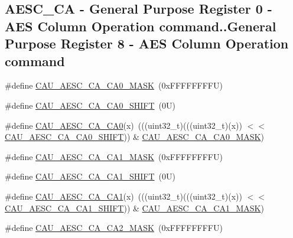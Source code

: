 \subsection*{A\+E\+S\+C\+\_\+\+CA -\/ General Purpose Register 0 -\/ A\+ES Column Operation command..General Purpose Register 8 -\/ A\+ES Column Operation command}
\begin{DoxyCompactItemize}
\item 
\#define \mbox{\hyperlink{group___c_a_u___register___masks_ga285f901e854cf3e043f122d717e5403d}{C\+A\+U\+\_\+\+A\+E\+S\+C\+\_\+\+C\+A\+\_\+\+C\+A0\+\_\+\+M\+A\+SK}}~(0x\+F\+F\+F\+F\+F\+F\+F\+F\+U)
\item 
\#define \mbox{\hyperlink{group___c_a_u___register___masks_gab92e18684282103f4374d6915f54d702}{C\+A\+U\+\_\+\+A\+E\+S\+C\+\_\+\+C\+A\+\_\+\+C\+A0\+\_\+\+S\+H\+I\+FT}}~(0\+U)
\item 
\#define \mbox{\hyperlink{group___c_a_u___register___masks_gae8fba02f39d10c4b97783417322f540c}{C\+A\+U\+\_\+\+A\+E\+S\+C\+\_\+\+C\+A\+\_\+\+C\+A0}}(x)~(((uint32\+\_\+t)(((uint32\+\_\+t)(x)) $<$$<$ \mbox{\hyperlink{group___c_a_u___register___masks_gab92e18684282103f4374d6915f54d702}{C\+A\+U\+\_\+\+A\+E\+S\+C\+\_\+\+C\+A\+\_\+\+C\+A0\+\_\+\+S\+H\+I\+FT}})) \& \mbox{\hyperlink{group___c_a_u___register___masks_ga285f901e854cf3e043f122d717e5403d}{C\+A\+U\+\_\+\+A\+E\+S\+C\+\_\+\+C\+A\+\_\+\+C\+A0\+\_\+\+M\+A\+SK}})
\item 
\#define \mbox{\hyperlink{group___c_a_u___register___masks_ga9a7a9ba574f5d6189c7e8f0089f64f8c}{C\+A\+U\+\_\+\+A\+E\+S\+C\+\_\+\+C\+A\+\_\+\+C\+A1\+\_\+\+M\+A\+SK}}~(0x\+F\+F\+F\+F\+F\+F\+F\+F\+U)
\item 
\#define \mbox{\hyperlink{group___c_a_u___register___masks_ga9b82dd689e9be0ca141d7be86cd16c73}{C\+A\+U\+\_\+\+A\+E\+S\+C\+\_\+\+C\+A\+\_\+\+C\+A1\+\_\+\+S\+H\+I\+FT}}~(0\+U)
\item 
\#define \mbox{\hyperlink{group___c_a_u___register___masks_gae92609b9dc76e27da2f6cec529382784}{C\+A\+U\+\_\+\+A\+E\+S\+C\+\_\+\+C\+A\+\_\+\+C\+A1}}(x)~(((uint32\+\_\+t)(((uint32\+\_\+t)(x)) $<$$<$ \mbox{\hyperlink{group___c_a_u___register___masks_ga9b82dd689e9be0ca141d7be86cd16c73}{C\+A\+U\+\_\+\+A\+E\+S\+C\+\_\+\+C\+A\+\_\+\+C\+A1\+\_\+\+S\+H\+I\+FT}})) \& \mbox{\hyperlink{group___c_a_u___register___masks_ga9a7a9ba574f5d6189c7e8f0089f64f8c}{C\+A\+U\+\_\+\+A\+E\+S\+C\+\_\+\+C\+A\+\_\+\+C\+A1\+\_\+\+M\+A\+SK}})
\item 
\#define \mbox{\hyperlink{group___c_a_u___register___masks_ga228d26ca32382c1c7fc31336cab80532}{C\+A\+U\+\_\+\+A\+E\+S\+C\+\_\+\+C\+A\+\_\+\+C\+A2\+\_\+\+M\+A\+SK}}~(0x\+F\+F\+F\+F\+F\+F\+F\+F\+U)

\end{DoxyCompactItemize}
